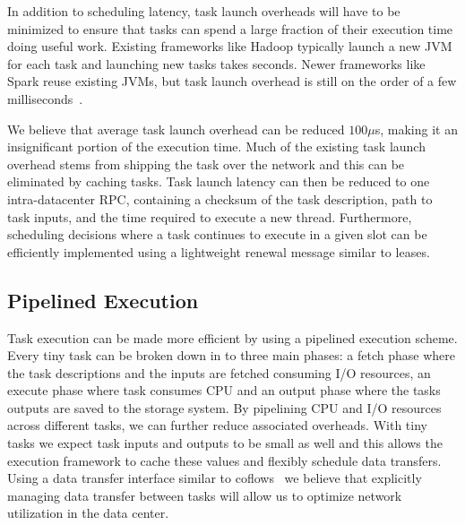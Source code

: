 In addition to scheduling latency, task launch overheads will have to be
minimized to ensure that tasks can spend a large fraction of their execution
time doing useful work. Existing frameworks like Hadoop typically launch a new
JVM for each task and launching new tasks takes  seconds. Newer
frameworks like Spark reuse existing JVMs, but task launch overhead is still on
the order of a few milliseconds~\cite{sparrow}.

We believe that average task launch overhead can be reduced $100 \mu$s, making it
an insignificant portion of the execution time. Much of the existing task launch
overhead stems from shipping the task over the network and this can be
eliminated by caching tasks. Task launch latency can then be reduced to one
intra-datacenter RPC, containing a checksum of the task description, path to
task inputs, and the time required to execute a new thread. Furthermore, 
scheduling decisions where a task continues to execute in a given slot can be 
efficiently implemented using a lightweight renewal message similar to leases.\\

\subsection{Pipelined Execution}
\label{sec:pipeline}
Task execution can be made more efficient by using a pipelined execution scheme.
Every tiny task can be broken down in to three main phases: a fetch phase where
the task descriptions and the inputs are fetched consuming I/O resources, an
execute phase where task consumes CPU and an output phase where the tasks
outputs are saved to the storage system. By pipelining CPU and I/O resources
across different tasks, we can further reduce associated overheads. With tiny
tasks we expect task inputs and outputs to be small as well and this allows the
execution framework to cache these values and flexibly schedule data transfers.
Using a data transfer interface similar to coflows~\cite{coflow-hotnets} we
believe that explicitly managing data transfer between tasks will allow us to
optimize network utilization in the data center.

